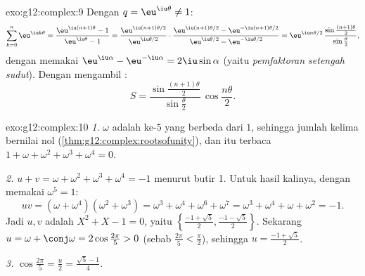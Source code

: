 \begin{solution}{exo:g12:complex:9}
Dengan $q = \eu^{\iu\theta} \neq 1$:
\[
\sum_{k=0}^{n} \eu^{\iu k\theta} = \frac{\eu^{\iu(n+1)\theta} - 1}{\eu^{\iu\theta} - 1}
= \frac{\eu^{\iu(n+1)\theta/2}}{\eu^{\iu\theta/2}}
\cdot\frac{\eu^{\iu(n+1)\theta/2} - \eu^{-\iu(n+1)\theta/2}}{\eu^{\iu\theta/2} - \eu^{-\iu\theta/2}}
= \eu^{\iu n\theta/2}\,
\frac{\sin\frac{(n+1)\theta}{2}}{\sin\frac{\theta}{2}},
\]
dengan memakai $\eu^{\iu\alpha} - \eu^{-\iu\alpha} = 2\iu\sin\alpha$ (yaitu
\emph{pemfaktoran setengah sudut}). Dengan mengambil :
\[
S = \frac{\sin\frac{(n+1)\theta}{2}}{\sin\frac{\theta}{2}}\,
\cos\frac{n\theta}{2}.
\]
\end{solution}

\begin{solution}{exo:g12:complex:10}
\emph{1.} $\omega$ adalah  ke-$5$ yang berbeda dari $1$, sehingga jumlah
kelima  bernilai nol (\cref{thm:g12:complex:rootsofunity}), dan itu terbaca
$1 + \omega + \omega^2 + \omega^3 + \omega^4 = 0$.

\emph{2.} $u + v = \omega + \omega^2 + \omega^3 + \omega^4 = -1$ menurut butir 1.
Untuk hasil kalinya, dengan memakai $\omega^5 = 1$:
\[
uv = (\omega + \omega^4)(\omega^2 + \omega^3)
= \omega^3 + \omega^4 + \omega^6 + \omega^7
= \omega^3 + \omega^4 + \omega + \omega^2 = -1 .
\]
Jadi $u, v$ adalah  $X^2 + X - 1 = 0$, yaitu
$\left\{\frac{-1+\sqrt5}{2}, \frac{-1-\sqrt5}{2}\right\}$. Sekarang
$u = \omega + \conj\omega = 2\cos\frac{2\pi}{5} > 0$ (sebab
$\frac{2\pi}{5} < \frac{\pi}{2}$), sehingga $u = \frac{-1 + \sqrt5}{2}$.

\emph{3.} $\cos\frac{2\pi}{5} = \frac u2 = \frac{\sqrt5 - 1}{4}$.
\end{solution}

